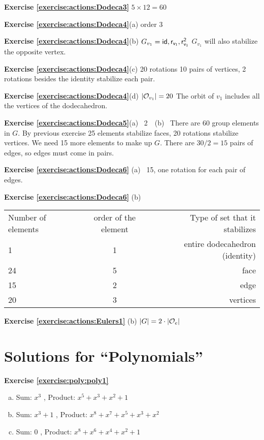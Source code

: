 \noindent\textbf{Exercise \ref{exercise:actions:Dodeca3}}
$5\times 12=60$

\noindent\textbf{Exercise \ref{exercise:actions:Dodeca4}}(a) 
order 3

\noindent\textbf{Exercise \ref{exercise:actions:Dodeca4}}(b) 
$G_{v_1}={\sf{id},r_{v_1},r_{v_1}^2}$ $G_{v_1}$ will also stabilize the opposite vertex.

\noindent\textbf{Exercise \ref{exercise:actions:Dodeca4}}(c) 
 20 rotations 10 pairs of vertices, 2 rotations besides the identity stabilize each pair.

\noindent\textbf{Exercise \ref{exercise:actions:Dodeca4}}(d) 
$|{\cal O}_{v_1}|=20$ The orbit of $v_1$ includes all the vertices of the dodecahedron.

\noindent\textbf{Exercise \ref{exercise:actions:Dodeca5}}(a) ~2~~(b)~
There are 60 group elements in $G$.  By previous exercise 25 elements stabilize faces, 20 rotations stabilize vertices. We need 15 more elements to make up $G$.  There are $30/2=15$ pairs of edges, so edges must come in pairs.

\noindent\textbf{Exercise \ref{exercise:actions:Dodeca6}} (a)~
 15, one rotation for each pair of edges.

\noindent\textbf{Exercise \ref{exercise:actions:Dodeca6}} (b)~

\begin{tabular}{ l c r }
Number of elements & order of the element & Type of set that it stabilizes \\
1 & 1 & entire dodecahedron (identity) \\
24 & 5 & face  \\
15 & 2 & edge \\
20 & 3  & vertices\\
\end{tabular}

\noindent\textbf{Exercise \ref{exercise:actions:Eulers1}} (b)
 $|G|=2\cdot |{\cal O}_e|$

\section{Solutions for ``Polynomials''}
\noindent{}\bigskip

\noindent\textbf{Exercise \ref{exercise:poly:poly1}}
\begin {enumerate} [(a)]
\item
 Sum: $x^3$ , Product: $x^5+x^3+x^2+1$
\item
 Sum: $x^3+1$ , Product: $x^8+x^7+x^5+x^3+x^2$
\item
 Sum: $0$ , Product: $x^8+x^6+x^4+x^2+1$
\end {enumerate}

